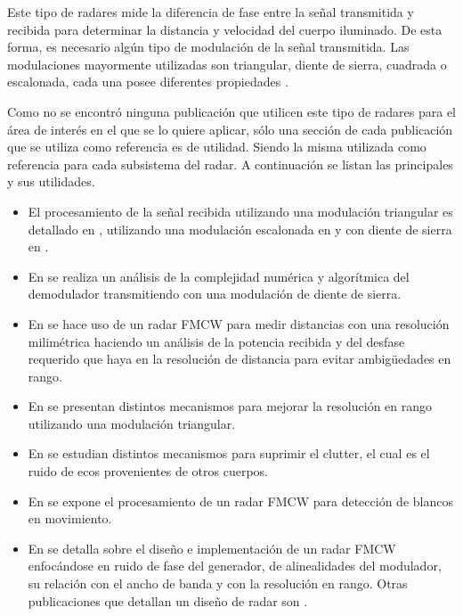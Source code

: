 Este tipo de radares mide la diferencia de fase entre la señal transmitida y recibida para determinar la distancia y velocidad del cuerpo iluminado. De esta forma, es necesario algún tipo de modulación de la señal transmitida. Las modulaciones mayormente utilizadas son triangular, diente de sierra, cuadrada o escalonada, cada una posee diferentes propiedades \cite{Basics2015}.

Como no se encontró ninguna publicación que utilicen este tipo de radares para el área de interés en el que se lo quiere aplicar, sólo una sección de cada publicación que se utiliza como referencia es de utilidad. Siendo la misma utilizada como referencia para cada subsistema del radar. A continuación se listan las principales y sus utilidades.

\begin{itemize}

    \item El procesamiento de la señal recibida utilizando una modulación triangular es detallado en \cite{Chang2006}, utilizando una modulación escalonada en \cite{steppedFreq} y con diente de sierra en \cite{Shen, Varavin2007a}.

    \item En \cite{Shen} se realiza un análisis de la complejidad numérica y algorítmica del demodulador transmitiendo con una modulación de diente de sierra.

    \item En \cite{Brennan2014a} se hace uso de un radar FMCW para medir distancias con una resolución milimétrica haciendo un análisis de la potencia recibida y del desfase requerido que haya en la resolución de distancia para evitar ambigüedades en rango.

    \item En \cite{Kurt2007} se presentan distintos mecanismos para mejorar la resolución en rango utilizando una modulación triangular.

    \item En \cite{Kurt2007, LeChevalier2011} se estudian distintos mecanismos para suprimir el clutter, el cual es el ruido de ecos provenientes de otros cuerpos.

    \item En \cite{Lipa1990} se expone el procesamiento de un radar FMCW para detección de blancos en movimiento.

    \item En \cite{Brooker2005} se detalla sobre el diseño e implementación de un radar FMCW enfocándose en ruido de fase del generador, de alinealidades del modulador, su relación con el ancho de banda y con la resolución en rango. Otras publicaciones que detallan un diseño de radar son \cite{Chan2009, Wavemaker2015}.

\end{itemize}
